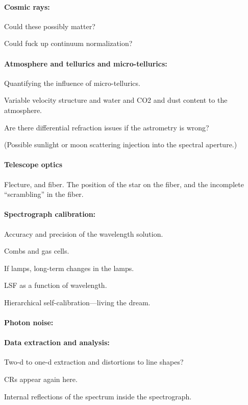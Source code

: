 \documentclass[12pt, fullpage, letterpaper]{article}
\begin{document}
\paragraph{Cosmic rays:}
Could these possibly matter?

Could fuck up continuum normalization?

\paragraph{Atmosphere and tellurics and micro-tellurics:}
Quantifying the influence of micro-tellurics.

Variable velocity structure and water and CO2 and dust content to the atmosphere.

Are there differential refraction issues if the astrometry is wrong?

(Possible sunlight or moon scattering injection into the spectral aperture.)

\paragraph{Telescope optics}
Flecture, and fiber. The position of the star on the fiber, and the
incomplete ``scrambling'' in the fiber.

\paragraph{Spectrograph calibration:}
Accuracy and precision of the wavelength solution.

Combs and gas cells.

If lamps, long-term changes in the lamps.

LSF as a function of wavelength.

Hierarchical self-calibration---living the dream.

\paragraph{Photon noise:}

\paragraph{Data extraction and analysis:}
Two-d to one-d extraction and distortions to line shapes?

CRs appear again here.

Internal reflections of the spectrum inside the spectrograph.
\end{document}

